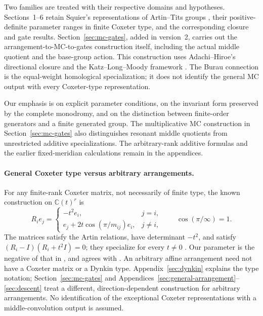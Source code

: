 \documentclass[11pt,a4paper]{article}
\theoremstyle{remark}\newtheorem{remark}[theorem]{Remark}
\newcommand{\C}{\mathbb C}
\begin{document}
Two families are treated with their respective domains and hypotheses.
Sections~1--6 retain Squier's representations of Artin--Tits groups
\cite{Squier}, their positive-definite parameter ranges in finite Coxeter
type, and the corresponding closure and gate results.
Section~\ref{sec:mc-gates}, added in version~2, carries out the
arrangement-to-MC-to-gates construction itself, including the actual
middle quotient and the base-group action. This construction uses
Adachi--Hiroe's directional closure \cite{AH,Hiroe} and the
Katz--Long--Moody framework \cite{HN}. The Burau connection is the
equal-weight homological specialization; it does not identify the
general MC output with every Coxeter-type representation.

Our emphasis is on explicit parameter conditions, on the invariant form
preserved by the complete monodromy, and on the distinction between
finite-order generators and a finite generated group. The multiplicative
MC construction in Section~\ref{sec:mc-gates} also distinguishes
resonant middle quotients from unrestricted additive specializations.
The arbitrary-rank additive formulas and the earlier fixed-meridian
calculations remain in the appendices.

\paragraph{General Coxeter type versus arbitrary arrangements.}
For any finite-rank Coxeter matrix, not necessarily of finite type, the
known construction on $\C(t)^r$ is
\begin{equation}\label{eq:coxeter-burau}
 R_i e_j=\begin{cases}
 -t^2 e_i,&j=i,\\
 e_j+2t\cos(\pi/m_{ij})e_i,&j\ne i,
 \end{cases}\qquad \cos(\pi/\infty)=1.
\end{equation}
The matrices satisfy the Artin relations, have determinant $-t^2$, and
satisfy $(R_i-I)(R_i+t^2I)=0$; they specialize for every $t\ne0$
\cite{Squier,BQ}.  Our parameter is the negative of that in
\cite[Definition 2.1]{BQ}, and agrees with \cite{SageArtin}.
An arbitrary affine arrangement need not have a Coxeter matrix or a
Dynkin type.  Appendix~\ref{sec:dynkin} explains the type notation;
Section~\ref{sec:mc-gates} and
Appendices~\ref{sec:general-arrangement}--\ref{sec:descent} treat a
different, direction-dependent construction for arbitrary arrangements.
No identification of the exceptional Coxeter representations with a
middle-convolution output is assumed.
\end{document}
